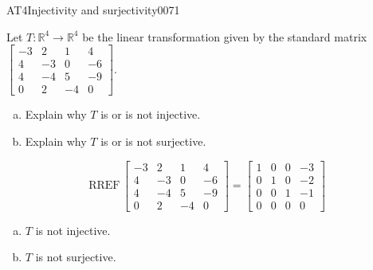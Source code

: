 \begin{exercise}{AT4}{Injectivity and surjectivity}{0071} 
\begin{exerciseStatement} 

 Let \(T:\mathbb{R}^4 \to \mathbb{R}^4\) be the linear transformation given by the standard matrix \(\left[\begin{array}{cccc}
-3 & 2 & 1 & 4 \\
4 & -3 & 0 & -6 \\
4 & -4 & 5 & -9 \\
0 & 2 & -4 & 0
\end{array}\right]\). 

 

\begin{enumerate}[(a)]
\item 

Explain why \(T\) is or is not injective.


\item 

Explain why \(T\) is or is not surjective.


\end{enumerate}

     \end{exerciseStatement}
 \begin{exerciseAnswer} 

\[\mathrm{RREF}\,\left[\begin{array}{cccc}
-3 & 2 & 1 & 4 \\
4 & -3 & 0 & -6 \\
4 & -4 & 5 & -9 \\
0 & 2 & -4 & 0
\end{array}\right]=\left[\begin{array}{cccc}
1 & 0 & 0 & -3 \\
0 & 1 & 0 & -2 \\
0 & 0 & 1 & -1 \\
0 & 0 & 0 & 0
\end{array}\right]\]

 

\begin{enumerate}[(a)]
\item  

\(T\) is not injective.

 
\item  

\(T\) is not surjective.

 
\end{enumerate}

     \end{exerciseAnswer}
 \end{exercise}


